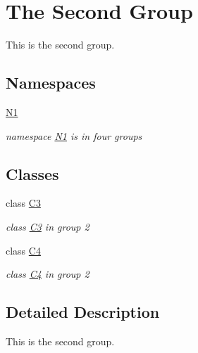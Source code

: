 \hypertarget{group__group2}{}\section{The Second Group}
\label{group__group2}


This is the second group.  


\subsection*{Namespaces}
\begin{DoxyCompactItemize}
\item 
 \mbox{\hyperlink{namespace_n1}{N1}}
\begin{DoxyCompactList}\small\item\em namespace \mbox{\hyperlink{namespace_n1}{N1}} is in four groups \end{DoxyCompactList}\end{DoxyCompactItemize}
\subsection*{Classes}
\begin{DoxyCompactItemize}
\item 
class \mbox{\hyperlink{class_c3}{C3}}
\begin{DoxyCompactList}\small\item\em class \mbox{\hyperlink{class_c3}{C3}} in group 2 \end{DoxyCompactList}\item 
class \mbox{\hyperlink{class_c4}{C4}}
\begin{DoxyCompactList}\small\item\em class \mbox{\hyperlink{class_c4}{C4}} in group 2 \end{DoxyCompactList}\end{DoxyCompactItemize}


\subsection{Detailed Description}
This is the second group. 

